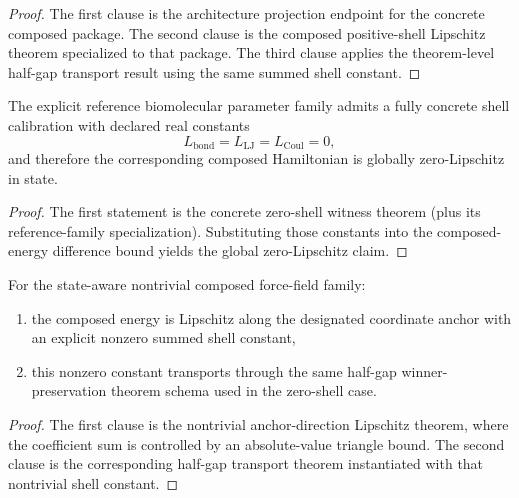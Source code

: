 \begin{proof}
The first clause is the architecture projection endpoint for the concrete composed package. The second clause is the composed positive-shell Lipschitz theorem specialized to that package. The third clause applies the theorem-level half-gap transport result using the same summed shell constant.
\end{proof}

\begin{theorem}\label{thm:reference-biomolecular-zero-shell-calibration}
The explicit reference biomolecular parameter family admits a fully concrete shell calibration with declared real constants
\[
L_{\mathrm{bond}}=L_{\mathrm{LJ}}=L_{\mathrm{Coul}}=0,
\]
and therefore the corresponding composed Hamiltonian is globally zero-Lipschitz in state.
\end{theorem}

\begin{proof}
The first statement is the concrete zero-shell witness theorem (plus its reference-family specialization). Substituting those constants into the composed-energy difference bound yields the global zero-Lipschitz claim.
\end{proof}

\begin{theorem}\label{thm:nontrivial-biomolecular-forcefield-transport}
For the state-aware nontrivial composed force-field family:
\begin{enumerate}
\item the composed energy is Lipschitz along the designated coordinate anchor with an explicit nonzero summed shell constant,
\item this nonzero constant transports through the same half-gap winner-preservation theorem schema used in the zero-shell case.
\end{enumerate}
\end{theorem}

\begin{proof}
The first clause is the nontrivial anchor-direction Lipschitz theorem, where the coefficient sum is controlled by an absolute-value triangle bound. The second clause is the corresponding half-gap transport theorem instantiated with that nontrivial shell constant.
\end{proof}

